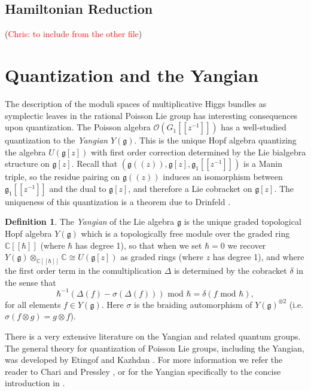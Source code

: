 \documentclass[11pt, oneside, reqno]{amsart}
\theoremstyle{definition} \newtheorem{definition}{Definition}[section]
\theoremstyle{definition} \newtheorem{remark}[definition]{Remark}
\theoremstyle{definition} \newtheorem{remarks}[definition]{Remarks}
\theoremstyle{definition} \newtheorem{question}[definition]{Question}
\theoremstyle{definition} \newtheorem*{note}{Note}
\theoremstyle{definition} \newtheorem{example}[definition]{Example}
\theoremstyle{definition} \newtheorem{examples}[definition]{Examples}
\renewcommand{\gg}{\mathfrak{g}}
\newcommand{\CC}{\mathbb{C}}
\newcommand{\OO}{\mathcal{O}}
\newcommand{\iso}{\cong}
\newcommand{\chris}[1]{(\textcolor{red}{Chris: #1})}
\begin{document}
\subsection{Hamiltonian Reduction} \label{Reduced_section}

\chris{to include from the other file}

\section{Quantization and the Yangian} \label{quantization_section}

The description of the moduli spaces of multiplicative Higgs bundles as symplectic leaves in the rational Poisson Lie group has interesting consequences upon quantization.  The Poisson algebra $\OO(G_1[[z^{-1}]])$ has a well-studied quantization to the \emph{Yangian} $Y(\gg)$.  This is the unique Hopf algebra quantizing the algebra $U(\gg[z])$ with first order correction determined by the Lie bialgebra structure on $\gg[z]$.  Recall that $(\gg(\!(z)\!), \gg[z], \gg_1[[z^{-1}]])$ is a Manin triple, so the residue pairing on $\gg(\!(z)\!)$ induces an isomorphism between $\gg_1[[z^{-1}]]$ and the dual to $\gg[z]$, and therefore a Lie cobracket on $\gg[z]$.  The uniqueness of this quantization is a theorem due to Drinfeld {\cite[Theorem 2]{DrinfeldQuantum1}}.

\begin{definition}
The \emph{Yangian} of the Lie algebra $\gg$ is the unique graded topological Hopf algebra $Y(\gg)$ which is a topologically free module over the graded ring $\CC[[\hbar]]$ (where $\hbar$ has degree 1), so that when we set $\hbar=0$ we recover $Y(\gg) \otimes_{\CC[[\hbar]]} \CC \iso U(\gg[z])$ as graded rings (where $z$ has degree 1), and where the first order term in the comultiplication $\Delta$ is determined by the cobracket $\delta$ in the sense that
\[\hbar^{-1}(\Delta(f) - \sigma(\Delta(f))) \text{ mod } \hbar = \delta(f \text{ mod } \hbar),\]
for all elements $f \in Y(\gg)$.  Here $\sigma$ is the braiding automorphism of $Y(\gg)^{\otimes 2}$ (i.e. $\sigma(f \otimes g) = g \otimes f$).
\end{definition}

There is a very extensive literature on the Yangian and related quantum groups.  The general theory for quantization of Poisson Lie groups, including the Yangian, was developed by Etingof and Kazhdan \cite{EtingofKazhdanIII}.  For more information we refer the reader to Chari and Pressley \cite{ChariPressley}, or for the Yangian specifically to the concise introduction in \cite[Section 9]{CostelloYangian}.
\end{document}
